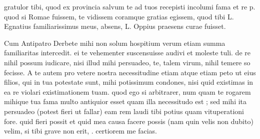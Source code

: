 


 gratulor tibi, quod ex provincia salvum te ad tuos recepisti incolumi fama et re p. quod si Romae fuissem, te vidissem coramque gratias egissem, quod tibi L. Egnatius familiarissimus meus, absens, L. Oppius praesens curae fuisset.

 Cum Antipatro Derbete mihi non solum hospitium verum etiam summa familiaritas intercedit. ei te vehementer suscensuisse audivi et moleste tuli. de re nihil possum iudicare, nisi illud mihi persuadeo, te, talem virum, nihil temere so fecisse. A te autem pro vetere nostra necessitudine etiam atque etiam peto ut eius filios, qui in tua potestate sunt, mihi potissimum condones, nisi quid existimas in ea re violari existimationem tuam. quod ego si arbitrarer, num quam te rogarem mihique tua fama multo antiquior esset quam illa necessitudo est ; sed mihi ita persuadeo (potest fieri ut fallar) eam rem laudi tibi potius quam vituperationi fore. quid fieri possit et quid mea causa facere possis (nam quin velis non dubito) velim, si tibi grave non erit, . certiorem me facias.

